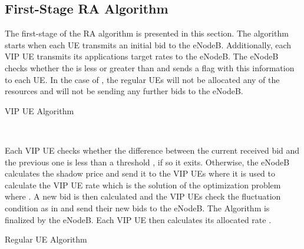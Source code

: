 \documentclass[journal]{IEEEtran} 				\IEEEoverridecommandlockouts 						\usepackage{amsmath,amssymb}
\begin{document}
\subsection{First-Stage RA Algorithm}\label{sec:UE_alloc_alg}
The first-stage of the RA algorithm is presented in this section. The algorithm starts when each UE transmits an initial bid  to the eNodeB. Additionally, each VIP UE transmits its applications target rates to the eNodeB. The eNodeB checks whether the  is less or greater than  and sends a flag with this information to each UE. In the case of , the regular UEs will not be allocated any of the resources and will not be sending any further bids to the eNodeB.\begin{algorithm}\caption{VIP UE Algorithm} \label{alg:VIP_UE_first-stage}
\begin{algorithmic}
\LOOP
	 
			\ELSE
		\ENDIF
        \ENDWHILE
	 
			\ELSE
    \IF {}
    \STATE {} \\
    \COMMENT {}
		\ENDIF
		\ENDIF
        \ENDWHILE
\ENDLOOP
\end{algorithmic}
\end{algorithm}
Each VIP UE checks whether the difference between the current received bid and the previous one is less than a threshold , if so it exits. Otherwise, the eNodeB calculates the shadow price  and send it to the VIP UEs where it is used to calculate the  VIP UE rate  which is the solution of the optimization problem  where . A new bid  is then calculated and the VIP UEs check the fluctuation condition as in \cite{Ahmed_Utility2} and send their new bids to the eNodeB. The Algorithm is finalized by the eNodeB. Each VIP UE then calculates its allocated rate .
\begin{algorithm}\caption{Regular UE Algorithm} \label{alg:UE_first-stage}
\begin{algorithmic}
\LOOP
	 
        \ENDWHILE
	 
     
			\ELSE
    \IF {}
    \STATE {} \\
    \COMMENT {}
		\ENDIF
        \ENDIF
        \ENDWHILE
\ENDLOOP
\end{algorithmic}
\end{algorithm}
\end{document}
